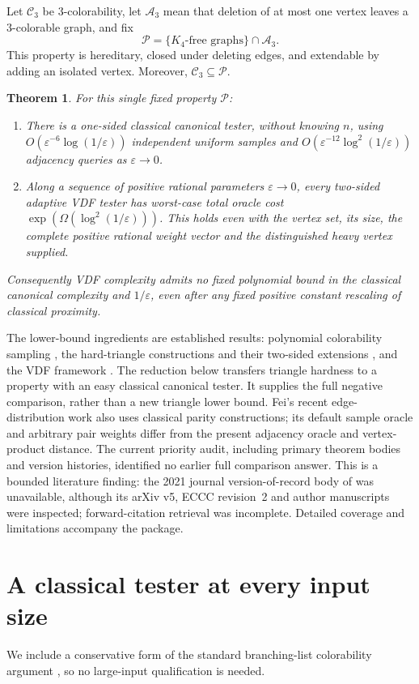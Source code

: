 \documentclass[11pt]{article}
\newtheorem{theorem}{Theorem}
\newcommand{\Cthree}{\mathcal C_3}
\newcommand{\Athree}{\mathcal A_3}
\newcommand{\PP}{\mathcal P}
\newcommand{\eps}{\varepsilon}
\begin{document}
Let $\Cthree$ be $3$-colorability, let $\Athree$ mean that deletion of
at most one vertex leaves a $3$-colorable graph, and fix
\[
                    \PP=\{K_4\text{-free graphs}\}\cap\Athree .
\]
This property is hereditary, closed under deleting edges, and
extendable by adding an isolated vertex. Moreover, $\Cthree\subseteq\PP$.

\begin{theorem}\label{thm:main}
For this single fixed property $\PP$:
\begin{enumerate}
\item There is a one-sided classical canonical tester, without knowing
$n$, using $O(\eps^{-6}\log(1/\eps))$ independent uniform samples and
$O(\eps^{-12}\log^2(1/\eps))$ adjacency queries as $\eps\to0$.
\item Along a sequence of positive rational parameters $\eps\to0$,
every two-sided adaptive VDF tester has worst-case total oracle cost
$\exp(\Omega(\log^2(1/\eps)))$. This holds even with the vertex set,
its size, the complete positive rational weight vector and the
distinguished heavy vertex supplied.
\end{enumerate}
Consequently VDF complexity admits no fixed polynomial bound in the
classical canonical complexity and $1/\eps$, even after any fixed
positive constant rescaling of classical proximity.
\end{theorem}

The lower-bound ingredients are established results: polynomial
colorability sampling \cite{GGR,AK}, the hard-triangle constructions and
their two-sided extensions \cite{Alon,AS,AKKR}, and the VDF framework
\cite{Goldreich,GS}. The reduction below transfers triangle hardness to
a property with an easy classical canonical tester. It supplies the
full negative comparison, rather than a new triangle lower bound.
Fei's recent edge-distribution work \cite{Fei} also uses classical
parity constructions; its default sample oracle and arbitrary pair
weights differ from the present adjacency oracle and vertex-product
distance. The current priority audit, including primary theorem bodies
and version histories, identified no earlier full comparison answer.
This is a bounded literature finding: the 2021 journal version-of-record
body of \cite{GS} was unavailable, although its arXiv v5, ECCC revision~2
and author manuscripts were inspected; forward-citation retrieval was
incomplete. Detailed coverage and limitations accompany the package.

\section{A classical tester at every input size}
We include a conservative form of the standard branching-list
colorability argument \cite{GGR,AK}, so no large-input qualification is
needed.
\end{document}

